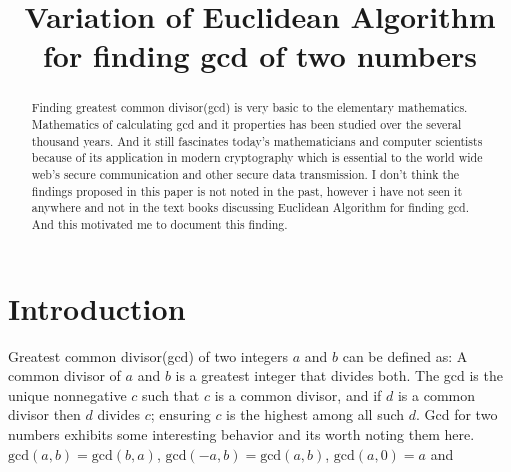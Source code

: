 \documentclass[conference,compsoc]{IEEEtran}
\renewcommand{\gcd}{\text{gcd}}
\begin{document}
%
\title {Variation of Euclidean Algorithm for finding gcd of two numbers} 

\author{
}


\maketitle

\begin{abstract}
Finding greatest common divisor(gcd) is very basic to the elementary mathematics.
Mathematics of calculating gcd and it properties has been studied over the several thousand years. And it still fascinates today's mathematicians and computer scientists 
because of its application in modern cryptography which is essential to the world wide web's secure communication and other secure data transmission.
I don't think the findings proposed in this paper is not noted in the past, however i have not seen it anywhere and not in the text books discussing Euclidean Algorithm for finding gcd. And this motivated me to document this finding. 
\end{abstract}


\section{Introduction}
Greatest common divisor(gcd) of two integers $a$ and $b$ can be defined as: A common divisor of $a$ and $b$ is a greatest integer that divides both. The gcd is the unique	nonnegative $c$ such that $c$ is a common divisor, and if $d$ is a common divisor then $d$ divides $c$; ensuring $c$ is the highest among all such $d$. 
Gcd for two numbers exhibits some interesting behavior and its worth noting them here.
$\gcd(a,b)=\gcd(b,a)$, $\gcd(-a,b)=\gcd(a,b)$,  $\gcd(a,0)=a$ and
\end{document}
